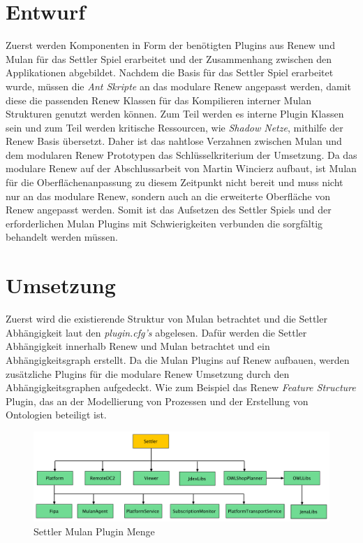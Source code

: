 \section{Entwurf}
	Zuerst werden Komponenten in Form der benötigten Plugins aus Renew und Mulan für das Settler Spiel erarbeitet und der Zusammenhang zwischen den Applikationen abgebildet.\bigbreak
	Nachdem die Basis für das Settler Spiel erarbeitet wurde, müssen die \textit{Ant Skripte} an das modulare Renew angepasst werden, damit diese die passenden Renew Klassen für das Kompilieren interner Mulan Strukturen genutzt werden können. Zum Teil werden es interne Plugin Klassen sein und zum Teil werden kritische Ressourcen, wie \textit{Shadow Netze}, mithilfe der Renew Basis übersetzt. Daher ist das nahtlose Verzahnen zwischen Mulan und dem modularen Renew Prototypen das Schlüsselkriterium der Umsetzung. \bigbreak
	Da das modulare Renew auf der Abschlussarbeit von Martin Wincierz \cite{martinWinc} aufbaut, ist Mulan für die Oberflächenanpassung zu diesem Zeitpunkt nicht bereit und muss nicht nur an das modulare Renew, sondern auch an die erweiterte Oberfläche von Renew angepasst werden.\newline
	Somit ist das Aufsetzen des Settler Spiels und der erforderlichen Mulan Plugins mit Schwierigkeiten verbunden die sorgfältig behandelt werden müssen. 

\section{Umsetzung}
	Zuerst wird die existierende Struktur von Mulan betrachtet und die Settler Abhängigkeit laut den \textit{plugin.cfg's} abgelesen. Dafür werden die Settler Abhängigkeit innerhalb Renew und Mulan betrachtet und ein Abhängigkeitsgraph erstellt. Da die Mulan Plugins auf Renew aufbauen, werden zusätzliche Plugins für die modulare Renew Umsetzung durch den Abhängigkeitsgraphen aufgedeckt. Wie zum Beispiel das Renew \textit{Feature Structure} Plugin, das an der Modellierung von Prozessen und der Erstellung von Ontologien beteiligt ist. \bigbreak

	\begin{figure}[h!]
	  \centering
	  \includegraphics[width=\textwidth]{material/images/settler-mulan-plugins.pdf}
	  \caption{Settler Mulan Plugin Menge}
	  \label{fig:settler_mulan_plugins}
	\end{figure}


